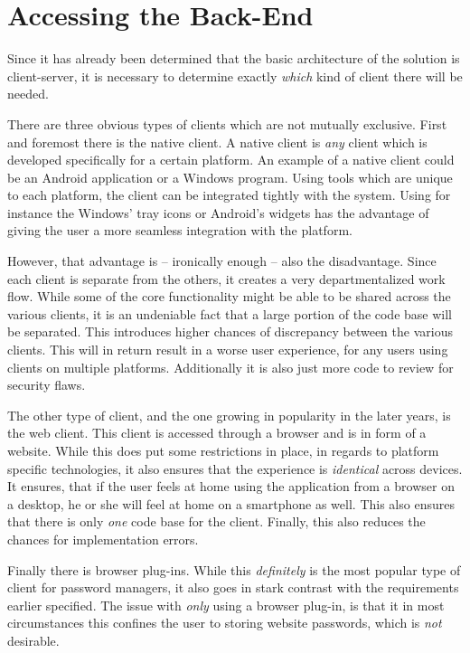 	\section{Accessing the Back-End}
		Since it has already been determined that the basic architecture of the solution is client-server, it is necessary to determine exactly \emph{which} kind of client there will be needed. 

		There are three obvious types of clients which are not mutually exclusive. First and foremost there is the native client. A native client is \emph{any} client which is developed specifically for a certain platform. An example of a native client could be an Android application or a Windows program. Using tools which are unique to each platform, the client can be integrated tightly with the system. Using for instance the Windows' tray icons or Android's widgets has the advantage of giving the user a more seamless integration with the platform. 

		However, that advantage is -- ironically enough -- also the disadvantage. Since each client is separate from the others, it creates a very departmentalized work flow. While some of the core functionality might be able to be shared across the various clients, it is an undeniable fact that a large portion of the code base will be separated. This introduces higher chances of discrepancy between the various clients. This will in return result in a worse user experience, for any users using clients on multiple platforms. Additionally it is also just more code to review for security flaws.

		The other type of client, and the one growing in popularity in the later years, is the web client. This client is accessed through a browser and is in form of a website. While this does put some restrictions in place, in regards to platform specific technologies, it also ensures that the experience is \emph{identical} across devices. It ensures, that if the user feels at home using the application from a browser on a desktop, he or she will feel at home on a smartphone as well. This also ensures that there is only \emph{one} code base for the client. Finally, this also reduces the chances for implementation errors.

		Finally there is browser plug-ins. While this \emph{definitely} is the most popular type of client for password managers, it also goes in stark contrast with the requirements earlier specified. The issue with \emph{only} using a browser plug-in, is that it in most circumstances this confines the user to storing website passwords, which is \emph{not} desirable.


